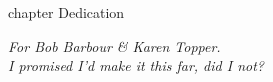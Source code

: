 \cleardoublepage
{}
{}
    {chapter}
    {Dedication}

\begin{center}
    \vspace*{\fill}
    \emph{For Bob Barbour \& Karen Topper.}
    \\
    \emph{I promised I'd make it this far, did I not?}
    \vspace*{\fill}
\end{center}
